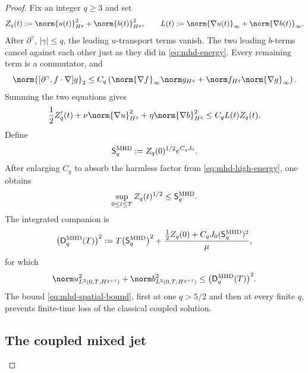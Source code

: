 \begin{proof}
Fix an integer \(q\ge3\) and set
\begin{equation}
 Z_q(t):=\norm{u(t)}_{H^q}^2+\norm{b(t)}_{H^q}^2,
 \qquad
 L(t):=\norm{\nabla u(t)}_\infty+\norm{\nabla b(t)}_\infty.
 \label{eq:mhd-high-variables}
\end{equation}
After \(\partial^\gamma\), \(|\gamma|\le q\), the leading
\(u\)-transport terms vanish.  The two leading \(b\)-terms cancel against
each other just as they did in \eqref{eq:mhd-energy}.  Every remaining term
is a commutator, and
\begin{equation}
 \norm{[\partial^\gamma,f\cdot\nabla]g}_2
 \le C_q\left(
  \norm{\nabla f}_\infty\norm g_{H^q}
  +\norm f_{H^q}\norm{\nabla g}_\infty
 \right).
 \label{eq:mhd-commutator}
\end{equation}
Summing the two equations gives
\begin{equation}
 \frac12Z_q'(t)
 +\nu\norm{\nabla u}_{H^q}^2
 +\eta\norm{\nabla b}_{H^q}^2
 \le C_qL(t)Z_q(t).
 \label{eq:mhd-high-energy}
\end{equation}
Define
\begin{equation}
 \mathsf S_q^{\rm MHD}
 :=Z_q(0)^{1/2}e^{C_qJ_0}.
 \label{eq:mhd-spatial-envelope}
\end{equation}
After enlarging \(C_q\) to absorb the harmless factor from
\eqref{eq:mhd-high-energy}, one obtains
\begin{equation}
 \sup_{0\le t\le T}Z_q(t)^{1/2}
 \le\mathsf S_q^{\rm MHD}.
 \label{eq:mhd-spatial-bound}
\end{equation}
The integrated companion is
\begin{equation}
 \bigl(\mathsf D_q^{\rm MHD}(T)\bigr)^2
 :=T\bigl(\mathsf S_q^{\rm MHD}\bigr)^2
 +\frac{\frac12Z_q(0)+C_qJ_0(\mathsf S_q^{\rm MHD})^2}{\mu},
 \label{eq:mhd-dissipation-envelope}
\end{equation}
for which
\begin{equation}
 \norm u_{L^2(0,T;H^{q+1})}^2
 +\norm b_{L^2(0,T;H^{q+1})}^2
 \le\bigl(\mathsf D_q^{\rm MHD}(T)\bigr)^2.
 \label{eq:mhd-dissipation-bound}
\end{equation}
The bound \eqref{eq:mhd-spatial-bound}, first at one \(q>5/2\) and then at
every finite \(q\), prevents finite-time loss of the classical coupled
solution.

\subsection{The coupled mixed jet}


\end{proof}
